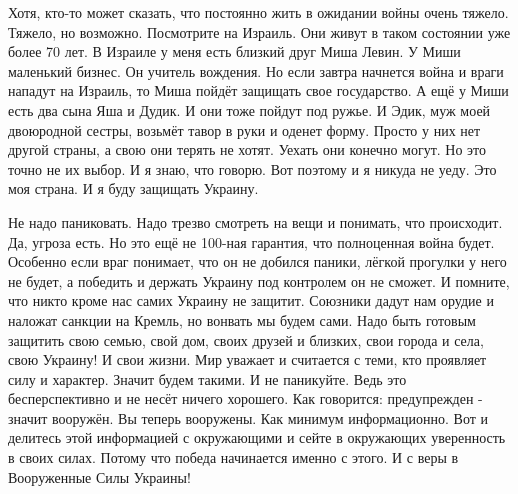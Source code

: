 Хотя, кто-то может сказать, что постоянно жить в ожидании войны очень тяжело.
Тяжело, но возможно. Посмотрите на Израиль. Они живут в таком состоянии уже
более 70 лет. В Израиле у меня есть близкий друг Миша Левин. У Миши маленький
бизнес. Он учитель вождения. Но если завтра начнется война и враги нападут на
Израиль, то Миша пойдёт защищать свое государство. А ещё у Миши есть два сына
Яша и Дудик. И они тоже пойдут под ружье. И Эдик, муж моей двоюродной сестры,
возьмёт тавор в руки и оденет форму. Просто у них нет другой страны, а свою они
терять не хотят. Уехать они конечно могут. Но это точно не их выбор. И я знаю,
что говорю. Вот поэтому и я никуда не уеду. Это моя страна. И я буду защищать
Украину. 

Не надо паниковать. Надо трезво смотреть на вещи и понимать, что происходит.
Да, угроза есть. Но это ещё не 100-ная гарантия, что полноценная война будет.
Особенно если враг понимает, что он не добился паники, лёгкой прогулки у него
не будет, а победить и держать Украину под контролем он не сможет. И помните,
что никто кроме нас самих Украину не защитит. Союзники дадут нам орудие и
наложат санкции на Кремль, но вонвать мы будем сами. Надо быть готовым защитить
свою семью, свой дом, своих друзей и близких, свои города и села, свою Украину!
И свои жизни. Мир уважает и считается с теми, кто проявляет силу и характер.
Значит будем такими. И не паникуйте. Ведь это бесперспективно и не несёт ничего
хорошего. Как говорится: предупрежден - значит вооружён. Вы теперь вооружены.
Как минимум информационно. Вот и делитесь этой информацией с окружающими и
сейте в окружающих уверенность в своих силах. Потому что победа начинается
именно с этого. И с веры в Вооруженные Силы Украины!
